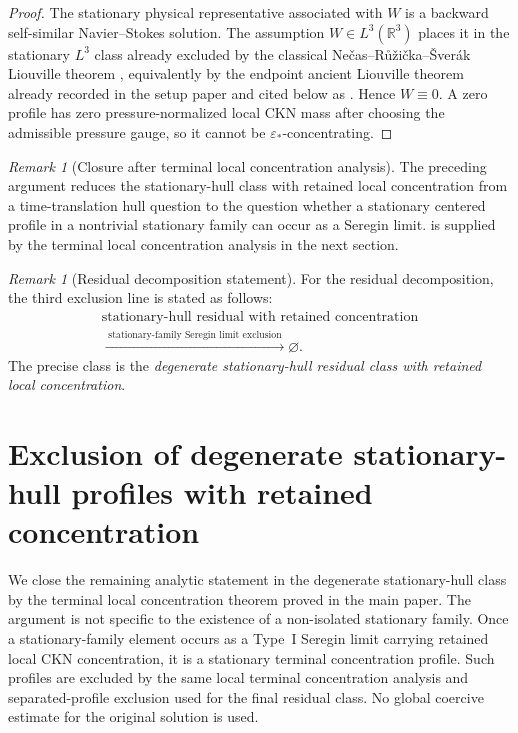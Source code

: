 \documentclass[11pt]{amsart}
\numberwithin{equation}{section}
\theoremstyle{plain}
\theoremstyle{definition}
\theoremstyle{remark}
\newtheorem{remark}[theorem]{Remark}
\begin{document}
\begin{proof}
The stationary physical representative associated with \(W\) is a backward
self-similar Navier--Stokes solution.  The assumption \(W\in L^3(\mathbb R^3)\)
places it in the stationary \(L^3\) class already excluded by the classical
Ne\v cas--R\r u\v zi\v cka--\v Sver\'ak Liouville theorem \cite{NRS1996},
equivalently by the endpoint ancient Liouville theorem already recorded in
the setup paper and cited below as .  Hence \(W\equiv0\).  A
zero profile has zero pressure-normalized local CKN mass after choosing the
admissible pressure gauge, so it cannot be \(\varepsilon_*\)-concentrating.
\end{proof}

\begin{remark}[Closure after terminal local concentration analysis]
\label{rem:R3-final-obligation}
The preceding argument reduces the stationary-hull class with retained local
concentration from a time-translation hull question to the question whether a
stationary centered profile in a nontrivial stationary family can occur as a
Seregin limit.
 is supplied by the terminal local
concentration analysis in the next section.
\end{remark}

\begin{remark}[Residual decomposition statement]
\label{rem:R3-decomposition-replacement}
For the residual decomposition, the third exclusion line is stated as follows:
\[
\begin{gathered}
   \text{stationary-hull residual with retained concentration}\\
   \xrightarrow{\;\text{stationary-family Seregin limit exclusion}\;}
   \varnothing .
\end{gathered}
\]
The precise class is the
\emph{degenerate stationary-hull residual class with retained local
concentration}.
\end{remark}


\section{Exclusion of degenerate stationary-hull profiles with retained concentration}
\label{sec:R3-terminal-stratification-closure}

We close the remaining analytic statement in the degenerate stationary-hull
class by the terminal local concentration theorem proved in the main
paper.  The argument is not specific to the existence of a
non-isolated stationary family.  Once a stationary-family element occurs as
a Type~I Seregin limit carrying retained local CKN concentration, it is a
stationary terminal concentration profile.  Such profiles are excluded by the
same local terminal concentration analysis and separated-profile exclusion used
for the final residual class.  No global coercive
estimate for the original solution is used.
\end{document}
